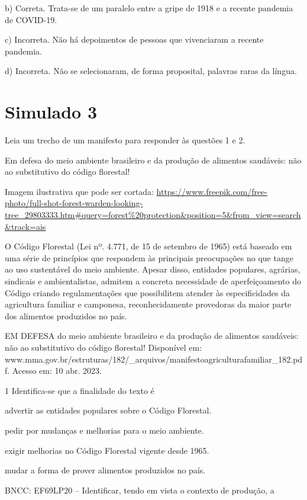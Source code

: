 b) Correta. Trata-se de um paralelo entre a gripe de 1918 e a recente
pandemia de COVID-19.

c) Incorreta. Não há depoimentos de pessoas que vivenciaram a recente
pandemia.

d) Incorreta. Não se selecionaram, de forma proposital, palavras raras
da língua.

\chapter{Simulado 3}

Leia um trecho de um manifesto para responder às questões 1 e 2.

Em defesa do meio ambiente brasileiro e da produção de alimentos
saudáveis: não ao substitutivo do código florestal!

Imagem ilustrativa que pode ser cortada:
\url{https://www.freepik.com/free-photo/full-shot-forest-warden-looking-tree_29803333.htm\#query=forest\%20protection\&position=5\&from_view=search\&track=ais}

O Código Florestal (Lei nº. 4.771, de 15 de setembro de 1965) está
baseado em uma série de princípios que respondem às principais
preocupações no que tange ao uso sustentável do meio ambiente. Apesar
disso, entidades populares, agrárias, sindicais e ambientalistas,
admitem a concreta necessidade de aperfeiçoamento do Código criando
regulamentações que possibilitem atender às especificidades da
agricultura familiar e camponesa, reconhecidamente provedoras da maior
parte dos alimentos produzidos no país.

EM DEFESA do meio ambiente brasileiro e da produção de alimentos
saudáveis: não ao substitutivo do código florestal! Disponível em:
www.mma.gov.br/estruturas/182/\_arquivos/manifestoagriculturafamiliar\_182.pdf.
Acesso em: 10 abr. 2023.

\num{1} Identifica-se que a finalidade do texto é

\begin{escolha}
\item advertir as entidades populares sobre o Código Florestal.

\item pedir por mudanças e melhorias para o meio ambiente.

\item exigir melhorias no Código Florestal vigente desde 1965.

\item mudar a forma de prover alimentos produzidos no país.

\end{escolha}BNCC: EF69LP20 -- Identificar, tendo em vista o contexto de produção, a

